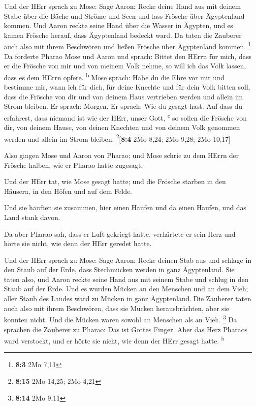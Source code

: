  Und der HErr sprach zu Mose: Sage Aaron: Recke deine Hand
aus mit deinem Stabe über die Bäche und Ströme und Seen und lass Frösche
über Ägyptenland kommen.  Und Aaron reckte seine Hand über
die Wasser in Ägypten, und es kamen Frösche herauf, dass Ägyptenland
bedeckt ward.  Da taten die Zauberer auch also mit ihrem
Beschwören und ließen Frösche über Ägyptenland kommen. \footnote{\textbf{8:3}
  2Mo 7,11}  Da forderte Pharao Mose und Aaron und sprach:
Bittet den HErrn für mich, dass er die Frösche von mir und von meinem
Volk nehme, so will ich das Volk lassen, dass es dem HErrn opfere.
\textsuperscript{b}  Mose sprach: Habe du die Ehre vor mir
und bestimme mir, wann ich für dich, für deine Knechte und für dein Volk
bitten soll, dass die Frösche von dir und von deinem Haus vertrieben
werden und allein im Strom bleiben.  Er sprach: Morgen. Er
sprach: Wie du gesagt hast. Auf dass du erfahrest, dass niemand ist wie
der HErr, unser Gott, \textsuperscript{c}  so sollen die
Frösche von dir, von deinem Hause, von deinen Knechten und von deinem
Volk genommen werden und allein im Strom bleiben.
\footnote{\textbf{8:15} 2Mo 14,25; 2Mo 4,21}{[}\textbf{8:4} 2Mo 8,24;
2Mo 9,28; 2Mo 10,17{]}

 Also gingen Mose und Aaron von Pharao; und Mose schrie zu
dem HErrn der Frösche halben, wie er Pharao hatte zugesagt.

 Und der HErr tat, wie Mose gesagt hatte; und die Frösche
starben in den Häusern, in den Höfen und auf dem Felde.

 Und sie häuften sie zusammen, hier einen Haufen und da
einen Haufen, und das Land stank davon.

 Da aber Pharao sah, dass er Luft gekriegt hatte,
verhärtete er sein Herz und hörte sie nicht, wie denn der HErr geredet
hatte.

 Und der HErr sprach zu Mose: Sage Aaron: Recke deinen
Stab aus und schlage in den Staub auf der Erde, dass Stechmücken werden
in ganz Ägyptenland.  Sie taten also, und Aaron reckte
seine Hand aus mit seinem Stabe und schlug in den Staub auf der Erde.
Und es wurden Mücken an den Menschen und an dem Vieh; aller Staub des
Landes ward zu Mücken in ganz Ägyptenland.  Die Zauberer
taten auch also mit ihrem Beschwören, dass sie Mücken herausbrächten,
aber sie konnten nicht. Und die Mücken waren sowohl an Menschen als an
Vieh. \footnote{\textbf{8:14} 2Mo 9,11}  Da sprachen die
Zauberer zu Pharao: Das ist Gottes Finger. Aber das Herz Pharaos ward
verstockt, und er hörte sie nicht, wie denn der HErr gesagt hatte.
\textsuperscript{b}

